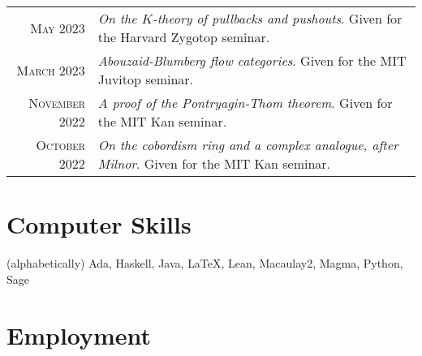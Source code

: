 \documentclass[a4paper,10pt]{article} %
\begin{document}
\begin{tabular}{rl}

\textsc{May} 2023 & \emph{On the $K$-theory of pullbacks and pushouts}. Given for the Harvard Zygotop seminar.\\

\textsc{March} 2023 & \emph{Abouzaid-Blumberg flow categories}. Given for the MIT Juvitop seminar.\\

\textsc{November} 2022 & \emph{A proof of the Pontryagin-Thom theorem}. Given for the MIT Kan seminar.\\

\textsc{October} 2022 & \emph{On the cobordism ring and a complex analogue, after Milnor}. Given for the MIT Kan seminar.

\end{tabular}



\section{Computer Skills}

(alphabetically) Ada, Haskell, Java, {\fb \LaTeX}, Lean, Macaulay2, Magma, Python, Sage


\section{Employment}
\end{document}
